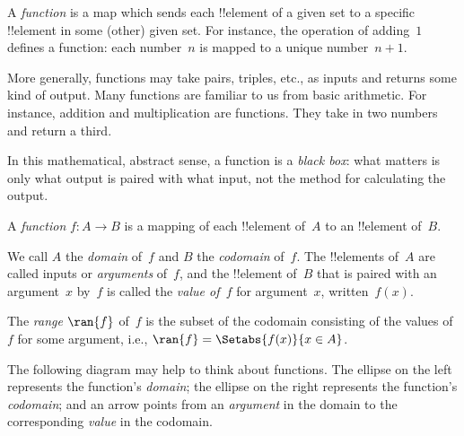 \documentclass[../../../include/open-logic-section]{subfiles}
\begin{document}

\begin{explain}
A \emph{function} is a map which sends each !!{element} of a given
set to a specific !!{element} in some (other) given set. For instance, the operation
of adding~$1$ defines a function: each number~$n$ is mapped to a
unique number~$n+1$. 

More generally, functions may take pairs, triples, etc., as inputs and returns some kind of output. Many
functions are familiar to us from basic arithmetic. For instance,
addition and multiplication are functions. They take in two numbers
and return a third.

In this mathematical, abstract sense, a function
is a \emph{black box}: what matters is only what output is paired with
what input, not the method for calculating the output.
\end{explain}

\begin{defn}[Function]
A \emph{function} $f \colon A \to B$ is a mapping of each !!{element}
of~$A$ to an !!{element} of~$B$. 

We call $A$ the \emph{domain} of~$f$
and $B$ the \emph{codomain} of~$f$.  The !!{element}s of~$A$ are
called inputs or \emph{arguments} of~$f$, and the !!{element} of~$B$
that is paired with an argument~$x$ by~$f$ is called the \emph{value
  of~$f$} for argument~$x$, written~$f(x)$.

The \emph{range} $\ran{f}$ of~$f$ is the subset of the codomain
consisting of the values of~$f$ for some argument, i.e., $\ran{f} =
\Setabs{f(x)}{x \in A}$.
\end{defn}
\begin{explain}
The following diagram may help to think about functions. The ellipse on the left represents the function's \emph{domain}; the ellipse on the right represents the function's \emph{codomain}; and an arrow points from an \emph{argument} in the domain to the corresponding \emph{value} in the codomain.
\end{explain}
\begin{center}
\end{center}
\end{document}
